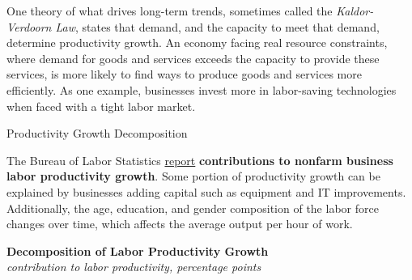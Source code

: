 \documentclass{report}
\makeatletter
\newcommand*\short[1]{\expandafter\@gobbletwo\number\numexpr#1\relax}
\newcommand{\ctsbar}[5]{
		\addplot[ybar stacked, bar width=#5, draw opacity=0, fill=#1] 
			table [x=#2, y=#3, col sep=comma]{#4};}
\newcommand{\dateaxisticks}{
		date coordinates in=x, axis line style={draw=none},
		xmax={2024-01-31},
		max space between ticks=40,	    
		xtick={{1990-01-01}, {1992-01-01}, {1994-01-01}, 
			{1996-01-01}, {1998-01-01}, {2000-01-01}, 
			{2002-01-01}, {2004-01-01}, {2006-01-01},
			{2008-01-01}, {2010-01-01}, {2012-01-01}, {2014-01-01},
		    {2016-01-01}, {2018-01-01}, {2020-01-01}, {2022-01-01}, 
		    {2024-01-01}, {2026-01-01}},
		minor xtick={{1989-01-01}, {1991-01-01}, {1993-01-01},
			{1995-01-01}, {1997-01-01}, {1999-01-01}, 
			{2001-01-01}, {2003-01-01}, {2005-01-01}, {2007-01-01},
		    {2009-01-01}, {2011-01-01}, {2013-01-01}, {2015-01-01},
		    {2017-01-01}, {2019-01-01}, {2021-01-01}, {2023-01-01}, 
		    {2025-01-01}, {2027-01-01}},
		enlarge y limits={0.06}, enlarge x limits={0.01},
		xticklabel style={align=center, yshift=-2pt}, tick label style={inner sep=0pt},
		}
\newcommand{\bbar}[2]{extra #1 ticks = {{#2}}, extra #1 tick labels = ,
		extra #1 tick style = {grid=major, grid style={thick, black!25}},}
\newcommand{\rbars}{
		\fill[color=black!10] (axis cs:{1990-07-01},\pgfkeysvalueof{/pgfplots/ymin})
			rectangle (axis cs:{1991-03-01}, \pgfkeysvalueof{/pgfplots/ymax});
		\fill[color=black!10] (axis cs:{2007-12-01},\pgfkeysvalueof{/pgfplots/ymin})
			rectangle (axis cs:{2009-07-01}, \pgfkeysvalueof{/pgfplots/ymax});
		\fill[color=black!10] (axis cs:{2001-03-01},\pgfkeysvalueof{/pgfplots/ymin})
			rectangle (axis cs:{2001-11-01}, \pgfkeysvalueof{/pgfplots/ymax});
		\fill[color=black!10] (axis cs:{2020-02-01},\pgfkeysvalueof{/pgfplots/ymin})
			rectangle (axis cs:{2020-05-01}, \pgfkeysvalueof{/pgfplots/ymax});}
\makeatother
\begin{document}
{\begin{minipage}{1.0\textwidth}
One theory of what drives long-term trends, sometimes called the \textit{Kaldor-Verdoorn Law}, states that demand, and the capacity to meet that demand, determine productivity growth. An economy facing real resource constraints, where demand for goods and services exceeds the capacity to provide these services, is more likely to find ways to produce goods and services more efficiently. As one example, businesses invest more in labor-saving technologies when faced with a tight labor market. 
\end{minipage}
\newpage
\begin{minipage}{1.0\textwidth}  
\normalsize Productivity Growth Decomposition
\vspace{-1mm} 

\small The Bureau of Labor Statistics \href{https://www.bls.gov/news.release/prod3.nr0.htm}{report} \textbf{contributions to nonfarm business labor productivity growth}. Some portion of productivity growth can be explained by businesses adding capital such as equipment and IT improvements. Additionally, the age, education, and gender composition of the labor force changes over time, which affects the average output per hour of work. 


\vspace{2mm}

\normalsize \textbf{Decomposition of Labor Productivity Growth}\\
\footnotesize{\textit{contribution to labor productivity, percentage points}}
\vspace{4.85cm}

\hspace{2mm} 


\end{minipage}}
\end{document}
